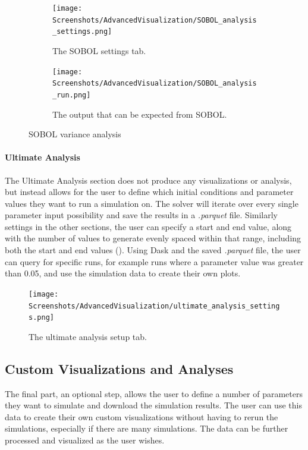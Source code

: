 \begin{figure}[!ht]
    \centering
    \begin{subfigure}{0.49\linewidth}
        \centering
        \captionsetup{width=1\linewidth}
        \texttt{[image: Screenshots/AdvancedVisualization/SOBOL\_analysis\_settings.png]}
        \caption{
            The SOBOL settings tab. 
        }
        \label{fig:ss:av:SOBOL_analysis_settings}
    \end{subfigure}
    \hfill
    \begin{subfigure}{0.49\linewidth}
        \centering
        \captionsetup{width=1\linewidth}
        \texttt{[image: Screenshots/AdvancedVisualization/SOBOL\_analysis\_run.png]}
        \caption{
            The output that can be expected from SOBOL. 
        }
        \label{fig:ss:av:SOBOL_analysis_run}
    \end{subfigure}
    \caption{SOBOL variance analysis}
\end{figure}

\paragraph{Ultimate Analysis}
\label{sec:ultimate_analysis}
The Ultimate Analysis section does not produce any visualizations or analysis, but instead allows for the user to define which initial conditions and parameter values they want to run a simulation on.
The solver will iterate over every single parameter input possibility and save the results in a \textit{.parquet} file.
Similarly settings in the other sections, the user can specify a start and end value, along with the number of values to generate evenly spaced within that range, including both the start and end values ().
\newline
Using Dask and the saved \textit{.parquet} file, the user can query for specific runs, for example runs where a parameter value was greater than 0.05, and use the simulation data to create their own plots.
\begin{figure}
    \centering
    \texttt{[image: Screenshots/AdvancedVisualization/ultimate\_analysis\_settings.png]}
    \caption{
        The ultimate analysis setup tab. 
    }
    \label{fig:ss:av:ultimate_analysis_settings}
\end{figure}

\subsection{Custom Visualizations and Analyses} 
\label{sec:custom_visualizations_and_framework}
The final part, an optional step, allows the user to define a number of parameters they want to simulate and download the simulation results. 
The user can use this data to create their own custom visualizations without having to rerun the simulations, especially if there are many simulations. 
The data can be further processed and visualized as the user wishes. 

